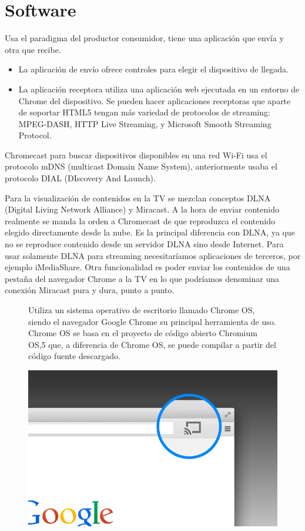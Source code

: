 \section{Software}
Usa el paradigma del productor consumidor, tiene una aplicación que envía y otra que recibe.
\begin{itemize}	
	\item La aplicación de envío ofrece controles para elegir el dispositivo de llegada.
	\item La aplicación receptora utiliza una aplicación web ejecutada en un entorno de Chrome del dispositivo. Se pueden hacer aplicaciones receptoras que aparte de soportar HTML5 tengan más variedad de protocolos de streaming: MPEG-DASH, HTTP Live Streaming, y Microsoft Smooth Streaming Protocol.
\end{itemize}

Chromecast para buscar dispositivos disponibles en una red Wi-Fi usa el protocolo mDNS (multicast Domain Name System), anteriormente usaba el protocolo DIAL (DIscovery And Launch).

Para la visualización de contenidos en la TV se mezclan conceptos DLNA (Digital Living Network Alliance) y Miracast\cite{DLNA-Miracast}.
A la hora de enviar contenido realmente se manda la orden a Chromecast de que reproduzca el contenido elegido directamente desde la nube.
Es la principal diferencia con DLNA, ya que no se reproduce contenido desde un servidor DLNA sino desde Internet.
Para usar solamente DLNA para streaming necesitaríamos aplicaciones de terceros, por ejemplo iMediaShare.
Otra funcionalidad es poder enviar los contenidos de una pestaña del navegador Chrome a la TV en lo que podríamos denominar una conexión Miracast pura y dura, punto a punto.




\begin{figure}[ht] 
	\begin{minipage}[b]{0.55\linewidth}
	Utiliza un sistema operativo de escritorio llamado Chrome OS, siendo el navegador Google Chrome su principal herramienta de uso.  
	Chrome OS se basa en el proyecto de código abierto Chromium OS,5 que, a diferencia de Chrome OS, se puede compilar a partir del código fuente descargado.
	\end{minipage}%
	\begin{minipage}[b]{0.45\linewidth}
		\centering
		\includegraphics[width=.65\linewidth]{./Imagenes/googlecastbrowser.jpg} 
	\end{minipage} 
\end{figure}







